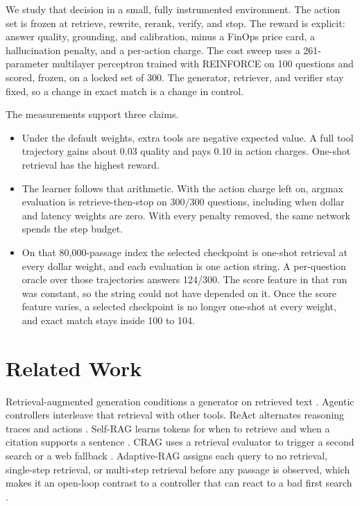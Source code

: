 \documentclass[letterpaper]{article} %
\begin{document}
We study that decision in a small, fully instrumented environment. The action set is frozen at retrieve, rewrite, rerank, verify, and stop. The reward is explicit: answer quality, grounding, and calibration, minus a FinOps price card, a hallucination penalty, and a per-action charge. The cost sweep uses a 261-parameter multilayer perceptron trained with REINFORCE on 100 questions and scored, frozen, on a locked set of 300. The generator, retriever, and verifier stay fixed, so a change in exact match is a change in control.

The measurements support three claims.
\begin{itemize}
\item Under the default weights, extra tools are negative expected value. A full tool trajectory gains about 0.03 quality and pays 0.10 in action charges. One-shot retrieval has the highest reward.
\item The learner follows that arithmetic. With the action charge left on, argmax evaluation is retrieve-then-stop on 300/300 questions, including when dollar and latency weights are zero. With every penalty removed, the same network spends the step budget.
\item On that 80{,}000-passage index the selected checkpoint is one-shot retrieval at every dollar weight, and each evaluation is one action string. A per-question oracle over those trajectories answers 124/300. The score feature in that run was constant, so the string could not have depended on it. Once the score feature varies, a selected checkpoint is no longer one-shot at every weight, and exact match stays inside 100 to 104.
\end{itemize}

\section{Related Work}
Retrieval-augmented generation conditions a generator on retrieved text \cite{lewis2020rag}. Agentic controllers interleave that retrieval with other tools. ReAct alternates reasoning traces and actions \cite{yao2023react}. Self-RAG learns tokens for when to retrieve and when a citation supports a sentence \cite{asai2024selfrag}. CRAG uses a retrieval evaluator to trigger a second search or a web fallback \cite{yan2024crag}. Adaptive-RAG assigns each query to no retrieval, single-step retrieval, or multi-step retrieval before any passage is observed, which makes it an open-loop contrast to a controller that can react to a bad first search \cite{jeong2024adaptive}.
\end{document}
